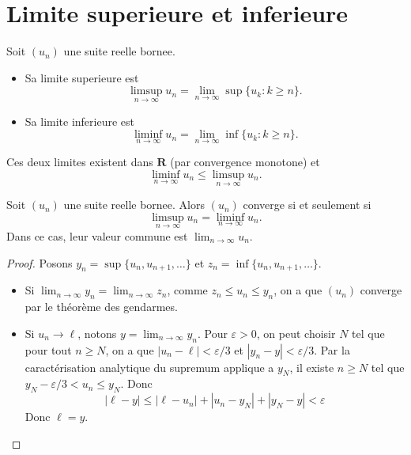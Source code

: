 \section{Limite superieure et inferieure}
\begin{definition}
Soit $(u_{n})$ une suite reelle bornee.
\begin{itemize}
\item Sa limite superieure est 
$$
\limsup_{ n \to \infty } u_{n}=\lim_{ n \to \infty } \sup \{ u_{k}:k\ge n \}.
$$
\item Sa limite inferieure est
$$
\liminf_{ n \to \infty } u_{n}=\lim_{ n \to \infty } \inf\{ u_{k}:k\ge n \}.
$$
\end{itemize}
\end{definition}
\begin{remark}
Ces deux limites existent dans $\mathbf{R}$ (par convergence monotone) et 
$$
\liminf_{ n \to \infty } u_{n}\le \limsup_{ n \to \infty } u_{n}.
$$
\end{remark}
\begin{theorem}
Soit $(u_{n})$ une suite reelle bornee. Alors $(u_{n})$ converge si et seulement si $$\limsup_{ n \to \infty }u_{n}=\liminf_{ n \to \infty }u_{n}.$$
Dans ce cas, leur valeur commune est $\lim_{ n \to \infty }u_{n}.$
\end{theorem}
\begin{proof}
Posons $y_{n}=\sup \{ u_{n},u_{n+1},\dots \}$ et $z_{n}=\inf \{ u_{n},u_{n+1},\dots \}$.
\begin{itemize}
\item Si $\lim_{ n \to \infty } y_{n}=\lim_{ n \to \infty }z_{n}$, comme $z_{n}\le u_{n}\le y_{n}$, on a que $(u_{n})$ converge par le théorème des gendarmes. 
\item Si $u_{n} \to \ell$, notons $y=\lim_{ n \to \infty } y_{n}$. Pour $\varepsilon>0$, on peut choisir $N$ tel que pour tout $n\ge N$, on a que $|u_{n}-\ell|<\varepsilon /3$ et $|y_{n}-y|<\varepsilon /3$. Par la caractérisation analytique du supremum applique a $y_{N}$, il existe $n\ge N$ tel que $y_{N}-\varepsilon /3<u_{n}\le y_{N}$. Donc 
$$
	|\ell -y|\le |\ell -u_{n}| + |u_{n}-y_{N}|+|y_{N}-y|<\varepsilon
$$
Donc $\ell=y$.
\end{itemize}
\end{proof}



